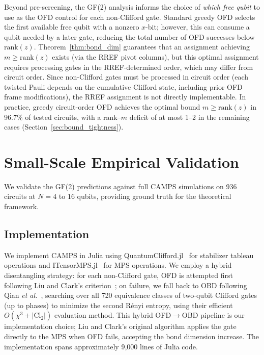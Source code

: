 \documentclass[a4paper,twocolumn,11pt]{quantumarticle}
\begin{document}
Beyond pre-screening, the GF(2) analysis informs the choice of \emph{which free qubit} to use as the OFD control for each non-Clifford gate.
Standard greedy OFD selects the first available free qubit with a nonzero $x$-bit; however, this can consume a qubit needed by a later gate, reducing the total number of OFD successes below $\mathrm{rank}(z)$.
Theorem~\ref{thm:bond_dim} guarantees that an assignment achieving $m \ge \mathrm{rank}(z)$ exists (via the RREF pivot columns), but this optimal assignment requires processing gates in the RREF-determined order, which may differ from circuit order.
Since non-Clifford gates must be processed in circuit order (each twisted Pauli depends on the cumulative Clifford state, including prior OFD frame modifications), the RREF assignment is not directly implementable.
In practice, greedy circuit-order OFD achieves the optimal bound $m \ge \mathrm{rank}(z)$ in 96.7\% of tested circuits, with a rank--$m$ deficit of at most 1--2 in the remaining cases (Section~\ref{sec:bound_tightness}).

\section{Small-Scale Empirical Validation}
\label{sec:validation}

We validate the GF(2) predictions against full CAMPS simulations on 936 circuits at $N = 4$ to $16$ qubits, providing ground truth for the theoretical framework.

\subsection{Implementation}

We implement CAMPS in Julia using QuantumClifford.jl~\cite{Krastanov2022} for stabilizer tableau operations and ITensorMPS.jl~\cite{Fishman2022} for MPS operations.
We employ a hybrid disentangling strategy: for each non-Clifford gate, OFD is attempted first following Liu and Clark's criterion~\cite{Liu2024}; on failure, we fall back to OBD following Qian \emph{et al.}~\cite{Qian2024}, searching over all 720 equivalence classes of two-qubit Clifford gates (up to phases) to minimize the second R\'enyi entropy, using their efficient $O(\chi^3 + |\mathrm{Cl}_2|)$ evaluation method.
This hybrid OFD$\to$OBD pipeline is our implementation choice; Liu and Clark's original algorithm applies the gate directly to the MPS when OFD fails, accepting the bond dimension increase.
The implementation spans approximately 9{,}000 lines of Julia code.
\end{document}
